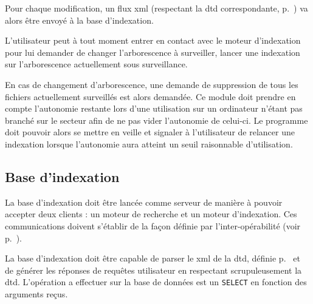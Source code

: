 \documentclass[a4paper,12pt]{report}
\begin{document}
Pour chaque modification, un flux \gls{xml} (respectant la \gls{dtd} correspondante, p.~\pageref{dtd_bi_mi}) va alors être envoyé à la base d'indexation.

L'utilisateur peut à tout moment entrer en contact avec le moteur d'indexation pour lui demander de changer l'\gls{arborescence} à surveiller, lancer une indexation sur l'\gls{arborescence} actuellement sous surveillance.

En cas de changement d'\gls{arborescence}, une demande de suppression de tous les \glspl{fichier} actuellement surveillés est alors demandée.
Ce module doit prendre en compte l'autonomie restante lors d'une utilisation sur un ordinateur n'étant pas branché sur le secteur afin de ne pas vider l'autonomie de celui-ci. Le programme doit pouvoir alors se mettre en veille et signaler à l'utilisateur de relancer une indexation lorsque l'autonomie aura atteint un seuil raisonnable d'utilisation.

\subsection{Base d'indexation}
La base d'indexation doit être lancée comme serveur de manière à pouvoir accepter deux clients : un moteur de recherche et un moteur d'indexation. Ces communications doivent s'établir de la façon définie par l'inter-opérabilité (voir p.~\pageref{inter_operabilite}).

La base d'indexation doit être capable de \gls{parser} le \gls{xml} de la \gls{dtd}, définie p.~\pageref{dtd} et de générer les réponses de requêtes utilisateur en respectant scrupuleusement la \gls{dtd}. L'opération a effectuer sur la base de données est un \verb"SELECT" en fonction des arguments reçus.
\end{document}
